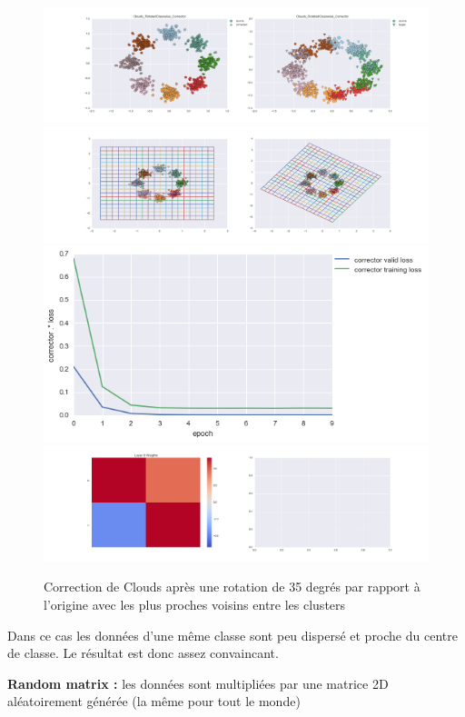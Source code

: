 \begin{figure}[H] %
\centering
\includegraphics[width=\linewidth]{fig/24-05-2016/clouds/Clouds_RotatedClasswise_Corrector-DATA.png}
\includegraphics[width=\linewidth]{fig/24-05-2016/clouds/Clouds_RotatedClasswise_Corrector-GridCheck.png}
\includegraphics[width=0.45\linewidth]{fig/24-05-2016/clouds/Clouds_RotatedClasswise_Corrector-Learning_curve.png}
\includegraphics[width=\linewidth]{fig/24-05-2016/clouds/Clouds_RotatedClasswise_Corrector-W.png}
\caption{Correction de Clouds après une rotation de 35 degrés par rapport à l'origine avec les plus proches voisins entre les clusters}
\label{fig:recap-clouds-rot-classwise}
\end{figure}

Dans ce cas les données d'une même classe sont peu dispersé et proche du centre de classe. 
Le résultat est donc assez convaincant.

{\Large \textbf{Random matrix :}} les données sont multipliées par une matrice 2D aléatoirement générée
 (la même pour tout le monde)

